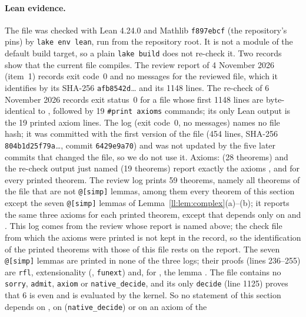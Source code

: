 \paragraph{Lean evidence.} The file was checked with Lean 4.24.0 and Mathlib \texttt{f897ebcf} (the repository's pins)
by \texttt{lake env lean}, run from the repository root. It is not a module of the default build target, so a plain
\texttt{lake build} does not re-check it. Two records show that the current file compiles. The review report
 of 4 November 2026 (item~1) records exit code~0 and no messages for the reviewed file,
which it identifies by its SHA-256 \texttt{afb8542d}\dots{} and its 1148 lines. The re-check
 of 6 November 2026 records exit status~0 for a file whose first
1148 lines are byte-identical to , followed by 19 \texttt{\#print axioms} commands;
its only Lean output is the 19 printed axiom lines. The log  (exit code~0, no
messages) names no file hash; it was committed with the first version of the file (454 lines, SHA-256
\texttt{804b1d25f79a}\dots, commit \texttt{6429e9a70}) and was not updated by the five later commits that changed the
file, so we do not use it. Axioms:  (28 theorems) and the re-check output just named
(19 theorems) report exactly the axioms ,  and  for every
printed theorem. The review log
 prints 59 theorems, namely all theorems of the file that are not \texttt{@[simp]}
lemmas, among them every theorem of this section except the seven \texttt{@[simp]} lemmas of
Lemma~\ref{ll:lem:complex}(a)--(b); it reports the same three axioms for each printed theorem, except that
 depends only on  and . This log comes from the review whose report is
named above; the check file from which the axioms were printed is not kept in the record, so the identification of
the printed theorems with those of this file rests on the report. The seven \texttt{@[simp]} lemmas are printed in
none of the three logs; their proofs (lines 236--255) are
\texttt{rfl}, extensionality (, \texttt{funext}) and, for , the lemma
. The file contains no \texttt{sorry}, \texttt{admit}, \texttt{axiom} or \texttt{native\_decide}, and its
only \texttt{decide} (line 1125) proves that $6$ is even and is evaluated by the kernel. So no statement of this
section depends on , on  (\texttt{native\_decide}) or on an axiom of the
